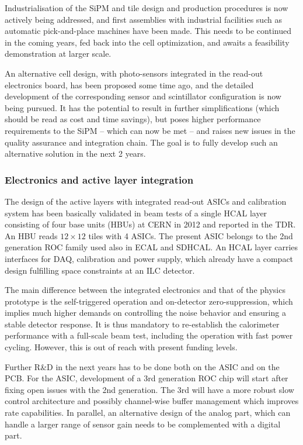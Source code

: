 Industrialisation of the SiPM and tile design and production procedures is now actively being addressed, and first assemblies with industrial facilities such as automatic pick-and-place machines have been made. This needs to be continued in the coming years, fed back into the cell optimization, and awaits a feasibility demonstration at larger scale.

An alternative cell design, with photo-sensors integrated in the read-out electronics board, has been proposed some time ago, and the detailed development of the corresponding sensor and scintillator configuration is now being pursued. It has the potential to result in further simplifications (which should be read as cost and time savings), but poses higher performance requirements to the SiPM -- which can now be met -- and raises new issues in the quality assurance and integration chain. The goal is to fully develop such an alternative solution in the next 2 years.

\subsubsection{Electronics and active layer integration}

The design of the active layers with integrated read-out ASICs and calibration system has been basically validated in beam tests of a single HCAL layer consisting of four base units (HBUs) at CERN in 2012 and reported in the TDR. An HBU reads $12 \times 12$ tiles with 4 ASICs. The present ASIC belongs to the 2nd generation ROC family used also in ECAL and SDHCAL. An HCAL layer carries interfaces for DAQ, calibration and power supply, which already have a compact design fulfilling space constraints at an ILC detector.

The main difference between the integrated electronics and that of the physics prototype is the self-triggered operation and on-detector zero-suppression, which implies much higher demands on controlling the noise behavior and ensuring a stable detector response. It is thus mandatory to re-establish the calorimeter performance with a full-scale beam test, including the operation with fast power cycling. However, this is out of reach with present funding levels.

Further R\&D in the next years has to be done both on the ASIC and on the PCB. For the ASIC, development of a 3rd generation ROC chip will start after fixing open issues with the 2nd generation. The 3rd will have a more robust slow control architecture and possibly channel-wise buffer management which improves rate capabilities. In parallel, an alternative design of the analog part, which can handle a larger range of sensor gain needs to be complemented with a digital part.

